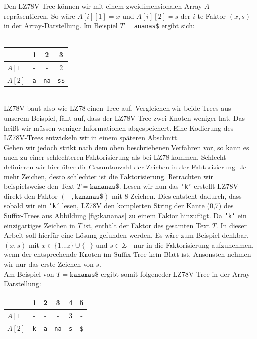\documentclass[a4paper,11pt]{scrartcl}%
\theoremstyle{change}
\theoremstyle{nonumberplain}
\theoremstyle{change}
\theoremstyle{nonumberplain}
\theoremstyle{change}
\theoremstyle{nonumberplain}
\begin{document}
	Den LZ78V-Tree können wir mit einem zweidimensionalen Array $A$ repräsentieren. So wäre $A[i][1] = x$ und $A[i][2] = s$ der $i$-te Faktor $(x,s)$ in der Array-Darstellung. Im Beispiel $T$ = \texttt{ananas\$} ergibt sich:\\\\
	\begin{tabular}{l c c c}
						\hline
							& 1 & 2 & 3 \\\hline
						$A[1]$ & - & - & 2 \\\hline
						$A[2]$	& \texttt{a} & \texttt{na} & \texttt{s\$}\\\hline
						
			
	\end{tabular}\\
	
LZ78V baut also wie LZ78 einen Tree auf. Vergleichen wir beide Trees aus unserem Beispiel, fällt auf, dass der LZ78V-Tree zwei Knoten weniger hat. Das heißt wir müssen weniger Informationen abgespeichert. Eine Kodierung des LZ78V-Trees entwickeln wir in einem späteren Abschnitt.\\
Gehen wir jedoch strikt nach dem oben beschriebenen Verfahren vor, so kann es auch zu einer schlechteren Faktorisierung als bei LZ78 kommen. Schlecht definieren wir hier über die Gesamtanzahl der Zeichen in der Faktorisierung. Je mehr Zeichen, desto schlechter ist die Faktorisierung. Betrachten wir beispielsweise den Text $T = \texttt{kananas\$}$. Lesen wir nun das \texttt{'k'} erstellt LZ78V direkt den Faktor $(-, \texttt{kananas\$})$ mit 8 Zeichen. Dies entsteht dadurch, dass sobald wir ein \texttt{'k'} lesen, LZ78V den kompletten String der Kante (0,7) des Suffix-Trees aus Abbildung \ref{fig:kananas} zu einem Faktor hinzufügt. Da \texttt{'k'} ein einzigartiges Zeichen in $T$ ist, enthält der Faktor des gesamten Text $T$. In dieser Arbeit soll hierfür eine Lösung gefunden werden. Es wäre zum Beispiel denkbar, $(x,s)$ mit $x \in \{1...z\} \cup \{-\}$ und $s \in \Sigma^{+}$ nur in die Faktorisierung aufzunehmen, wenn der entsprechende Knoten im Suffix-Tree kein Blatt ist. Ansonsten nehmen wir nur das erste Zeichen von $s$.\\ Am Beispiel von $T = \texttt{kananas\$}$ ergibt somit folgeneder LZ78V-Tree in der Array-Darstellung:\\

\begin{tabular}{l c c c c c}
						\hline
							& 1 & 2 & 3 & 4 & 5\\\hline
						$A[1]$ & - & - & - & 3 & -\\\hline
						$A[2]$	& \texttt{k} & \texttt{a} & \texttt{na} & \texttt{s} & \texttt{\$}\\\hline
						
			
\end{tabular}\\
\end{document}
